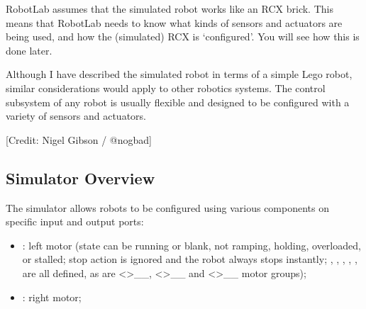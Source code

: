 \documentclass[letterpaper,10pt,english]{sphinxmanual}
\let\sphinxpxdimen\pdfpxdimen\else\newdimen\sphinxpxdimen
\begin{document}
RobotLab assumes that the simulated robot works like an RCX brick. This means that RobotLab needs to know what kinds of sensors and actuators are being used, and how the (simulated) RCX is ‘configured’. You will see how this is done later.

Although I have described the simulated robot in terms of a simple Lego robot, similar considerations would apply to other robotics systems. The control subsystem of any robot is usually flexible and designed to be configured with a variety of sensors and actuators.

\noindent\sphinxincludegraphics[width=4608\sphinxpxdimen,height=2592\sphinxpxdimen]{{nogbad_ev3}.jpg}

{[}Credit: Nigel Gibson / @nogbad{]}


\subsection{Simulator Overview}
\label{\detokenize{content/00_SOFTWARE_GUIDE/Section_00_02_ev3devsim_simulator_overview:Simulator-Overview}}
The  simulator allows robots to be configured using various components on specific input and output ports:
\begin{itemize}
\item {} 
: left motor (state can be running or blank, not ramping, holding, overloaded, or stalled; stop action is ignored and the robot always stops instantly; , , , , ,  are all defined, as are  \textless{}\textgreater{}\textasciigrave{}\_\_,
 \textless{}\textgreater{}\textasciigrave{}\_\_ and  \textless{}\textgreater{}\textasciigrave{}\_\_ motor groups);

\item {} 
: right motor;

\end{itemize}
\end{document}
